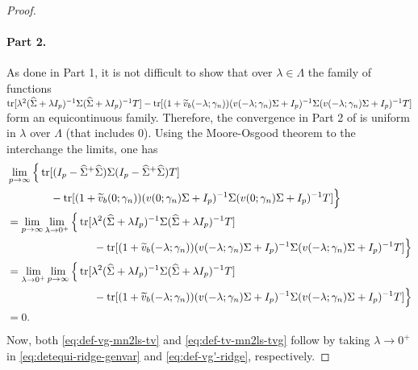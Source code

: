 \documentclass{article}
\begin{document}
\begin{proof}
    \paragraph{Part 2.}
    As done in Part 1,
    it is not difficult to show
    that over $\lambda \in \Lambda$
    the family of functions
    $\operatorname{tr}[\lambda^2 ({\widehat{\Sigma}} + \lambda I_p)^{-1} \Sigma ({\widehat{\Sigma}} + \lambda I_p)^{-1} T]
    - \operatorname{tr}[(1 + \widetilde{v}_b(-\lambda; \gamma_n)) (v(-\lambda; \gamma_n) \Sigma + I_p)^{-1} \Sigma 
    (v(-\lambda; \gamma_n) \Sigma + I_p)^{-1} T]$
    form an equicontinuous family.
    Therefore,
    the convergence in Part 2 of 
    is uniform in $\lambda$ over $\Lambda$ (that includes $0$).
    Using the Moore-Osgood theorem
    to the interchange the limits,
    one has
    \begin{align*}
        &\lim_{p \to \infty}
        \Big\{
        \operatorname{tr}[(I_p - {\widehat{\Sigma}}^{+} {\widehat{\Sigma}}) \Sigma (I_p - {\widehat{\Sigma}}^{+} {\widehat{\Sigma}}) T] \\
        &\qquad \qquad
        -
        \operatorname{tr}[ 
        (1 + \widetilde{v}_b(0; \gamma_n))
        (v(0; \gamma_n) \Sigma + I_p)^{-1} 
        \Sigma
        (v(0; \gamma_n) \Sigma + I_p)^{-1}
        T
        ]  \Big\}
        \\
        &=
        \lim_{p \to \infty}
        \lim_{\lambda \to 0^{+}}
        \Big\{
        \operatorname{tr}[\lambda^2 ({\widehat{\Sigma}} + \lambda I_p)^{-1} \Sigma ({\widehat{\Sigma}} + \lambda I_p)^{-1} T] \\
        &\qquad \qquad \qquad \qquad - \operatorname{tr}[ (1 + \widetilde{v}_b(-\lambda; \gamma_n))  (v(-\lambda; \gamma_n) \Sigma + I_p)^{-1} 
        \Sigma
        (v(-\lambda; \gamma_n) \Sigma + I_p)^{-1} T] \Big\} \\
        &=
        \lim_{\lambda \to 0^{+}}
        \lim_{p \to \infty}
        \Big\{
        \operatorname{tr}[\lambda^2 ({\widehat{\Sigma}} + \lambda I_p)^{-1} \Sigma ({\widehat{\Sigma}} + \lambda I_p)^{-1} T] \\
        &\qquad \qquad \qquad \qquad - \operatorname{tr}[ (1 + \widetilde{v}_b(-\lambda; \gamma_n)) (v(-\lambda; \gamma_n) \Sigma + I_p)^{-1}
        \Sigma
        (v(-\lambda; \gamma_n) \Sigma + I_p)^{-1} T] \Big\} \\
        &= 0.
    \end{align*}
    Now, both \eqref{eq:def-vg-mn2ls-tv} and \eqref{eq:def-tv-mn2ls-tvg}
    follow by taking $\lambda \to 0^{+}$
    in 
    \eqref{eq:detequi-ridge-genvar}
    and
    \eqref{eq:def-vg'-ridge},
    respectively.
\end{proof}



\end{document}
